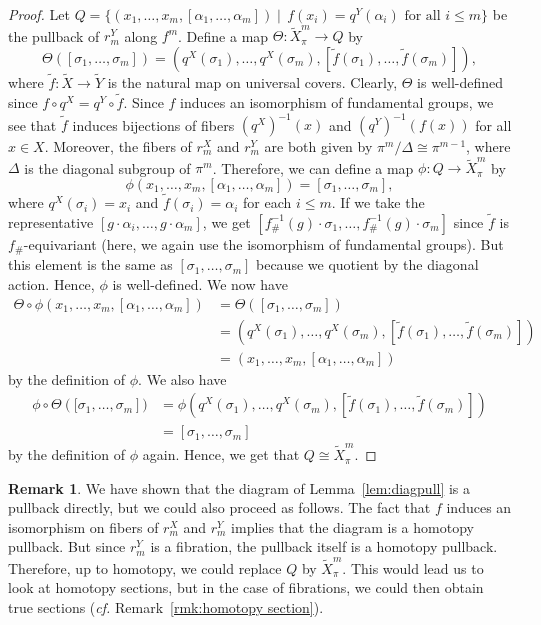 \documentclass[amscd,amssymb,verbatim,11pt]{amsart}
\theoremstyle{plain}
\theoremstyle{definition}
\newtheorem{remark}[thm]{Remark}
\newcommand{\Wi}{\widetilde}
\begin{document}
\begin{proof}
Let $Q=\{(x_1,\ldots,x_m,[\alpha_1,\ldots,\alpha_m])\mid\, f(x_i)=q^Y(\alpha_i) \text{ for all }i\le m\}$ be the pullback of $r_m^Y$ along $f^m$. Define a map $\Theta\colon \Wi{X}^m_\pi \to Q$ by
\[
\Theta([\sigma_1,\ldots,\sigma_m]) =  (q^X(\sigma_1),\ldots, q^X(\sigma_m),[\Wi f(\sigma_1),\ldots,\Wi f(\sigma_m)]),
\]
where $\Wi{f}\colon \Wi{X}\to \Wi{Y}$ is the natural map on universal covers. Clearly, $\Theta$ is well-defined since $f \circ q^X = q^Y \circ \Wi f$. Since $f$ induces an isomorphism of fundamental groups, we see that
$\Wi f$ induces bijections of 
fibers $(q^X)^{-1}(x)$ and $(q^Y)^{-1}(f(x))$ for all $x\in X$. Moreover, 
the fibers of $r_m^X$ and $r_m^Y$ are both given by
$\pi^m/\Delta \cong \pi^{m-1}$, where $\Delta$ is the diagonal subgroup of $\pi^m$. Therefore, we can define a map $\phi\colon Q \to \Wi{X}^m_\pi$ by
\[
\phi(x_1,\ldots,x_m,[\alpha_1,\ldots,\alpha_m]) = [\sigma_1,\ldots,\sigma_m],
\]
where $q^X(\sigma_i)=x_i$ and $\Wi f(\sigma_i) = \alpha_i$ for each $i\le m$. If we take the representative $[g\cdot \alpha_i,\ldots, g\cdot \alpha_m]$, we get $[f_\#^{-1}(g)\cdot \sigma_1,\ldots,f_\#^{-1}(g)\cdot \sigma_m]$ since $\Wi f$ is $f_\#$-equivariant (here, we again use the isomorphism of fundamental groups). 
But this element is the same as $[\sigma_1,\ldots,\sigma_m]$ because we quotient by the diagonal action. Hence, $\phi$ is well-defined. We now have
\begin{align*}
\Theta\circ \phi(x_1,\ldots,x_m,[\alpha_1,\ldots, \alpha_m]) 
& 
= \Theta([\sigma_1,\ldots,\sigma_m]) 
\\
& 
= (q^X(\sigma_1),\ldots,q^X(\sigma_m),[\Wi f(\sigma_1),\ldots,\Wi f(\sigma_m)]) 
\\
& 
= (x_1,\ldots,x_m,[\alpha_1,\ldots,\alpha_m])
\end{align*}
by the definition of $\phi$. We also have
\begin{align*}
\phi\circ \Theta\left([\sigma_1,\ldots,\sigma_m\right]) 
& 
= \phi(q^X(\sigma_1),\ldots,q^X(\sigma_m),[\Wi f(\sigma_1),\ldots,\Wi f(\sigma_m)]) 
\\
& 
= \left[\sigma_1,\ldots,\sigma_m\right]
\end{align*}
by the definition of $\phi$ again. Hence, we get that $Q \cong \Wi{X}^m_\pi$.
\end{proof}

\begin{remark}\label{rem:homopull}
We have shown that the diagram of Lemma~\ref{lem:diagpull} is a pullback 
directly, but we could also proceed as follows. The fact that $f$ induces an isomorphism
on fibers of $r_m^X$ and $r_m^Y$ implies that the diagram is a homotopy pullback. 
But since $r_m^Y$ is a fibration, the pullback itself is a homotopy pullback. 
Therefore, up to homotopy, we could replace $Q$ by $\Wi{X}^m_\pi$. This would lead us to look at homotopy sections, but in the case of fibrations,
we could then obtain true sections (\emph{cf.} Remark~\ref{rmk:homotopy section}). 
\end{remark}
\end{document}
